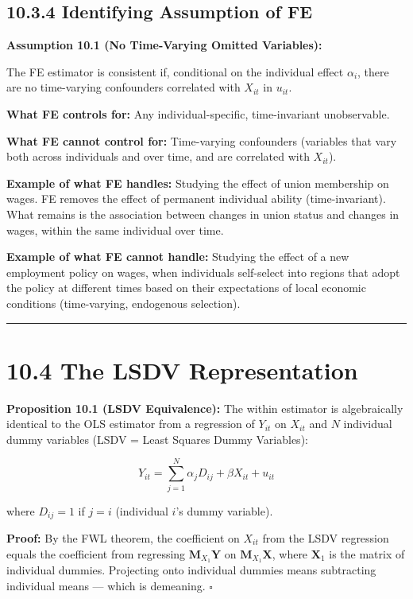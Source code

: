 \subsection{10.3.4 Identifying Assumption of FE}

\textbf{Assumption 10.1 (No Time-Varying Omitted Variables):}

The FE estimator is consistent if, conditional on the individual effect $\alpha_i$, there are no time-varying confounders correlated with $X_{it}$ in $u_{it}$.

\textbf{What FE controls for:} Any individual-specific, time-invariant unobservable.

\textbf{What FE cannot control for:} Time-varying confounders (variables that vary both across individuals and over time, and are correlated with $X_{it}$).

\textbf{Example of what FE handles:} Studying the effect of union membership on wages. FE removes the effect of permanent individual ability (time-invariant). What remains is the association between changes in union status and changes in wages, within the same individual over time.

\textbf{Example of what FE cannot handle:} Studying the effect of a new employment policy on wages, when individuals self-select into regions that adopt the policy at different times based on their expectations of local economic conditions (time-varying, endogenous selection).

\medskip\hrule\medskip

\section{10.4 The LSDV Representation}

\textbf{Proposition 10.1 (LSDV Equivalence):} The within estimator is algebraically identical to the OLS estimator from a regression of $Y_{it}$ on $X_{it}$ and $N$ individual dummy variables (LSDV = Least Squares Dummy Variables):

\[
Y_{it} = \sum_{j=1}^N \alpha_j D_{ij} + \beta X_{it} + u_{it}
\]

where $D_{ij} = 1$ if $j = i$ (individual $i$'s dummy variable).

\textbf{Proof:} By the FWL theorem, the coefficient on $X_{it}$ from the LSDV regression equals the coefficient from regressing $\mathbf{M}_{X_1}\mathbf{Y}$ on $\mathbf{M}_{X_1}\mathbf{X}$, where $\mathbf{X}_1$ is the matrix of individual dummies. Projecting onto individual dummies means subtracting individual means --- which is demeaning. $\square$

